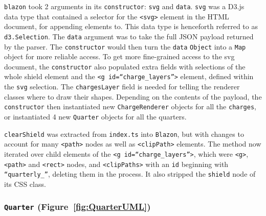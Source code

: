\documentclass[nobib, a4paper, twoside, justified]{tufte-book}
\makeatletter
\newcommand{\svg}{\gls{svg}\@\xspace}
\newcommand{\charges}{\glspl{charge}\@\xspace}
\newcommand{\quarters}{\glspl{quarter}\@\xspace}
\newcommand{\ublazon}{\Gls{blazon}\@\xspace}
\newcommand{\payload}{\gls{payload}\@\xspace}
\makeatother
\begin{document}
\texttt{\ublazon} took 2 arguments in its \texttt{constructor}: \texttt{svg} and \texttt{data}.
\texttt{svg} was a D3.js~\autocite{d3js} data type that contained a selector for the \texttt{<svg>}
element in the HTML document, for appending elements to. This data type is henceforth referred to
as \texttt{d3.Selection}. The \texttt{data} argument was to take the full JSON \payload returned by
the parser. The \texttt{constructor} would then turn the \texttt{data} \texttt{Object} into a
\texttt{Map} object for more reliable access. To get more fine-grained access to the \svg document,
the \texttt{constructor} also populated extra fields with selections of the whole shield element
and the \texttt{<g id=``charge\_layers''>} element, defined within the \texttt{svg} selection. The
\texttt{chargesLayer} field is needed for telling the renderer classes where to draw their shapes.
Depending on the contents of the \payload, the \texttt{constructor} then instantiated new
\texttt{ChargeRenderer} objects for all the \texttt{\charges}, or instantiated 4 new
\texttt{Quarter} objects for all the \quarters.

\texttt{clearShield} was extracted from \texttt{index.ts} into \texttt{Blazon}, but with changes to
account for many \texttt{<path>} nodes as well as \texttt{<clipPath>} elements. The method now
iterated over child elements of the \texttt{<g id=``charge\_layers''>}, which were \texttt{<g>},
\texttt{<path>} and \texttt{<rect>} nodes, and \texttt{<clipPaths>} with an \texttt{id} beginning
with \texttt{``quarterly\_''}, deleting them in the process. It also stripped the \texttt{shield}
node of its CSS class.

\subsubsection{\texttt{Quarter} (Figure~\ref{fig:QuarterUML})}%
\label{ssub:quarter}
\end{document}
